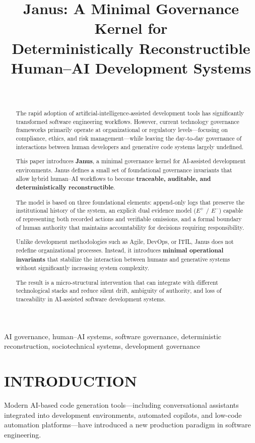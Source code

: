 \documentclass[conference]{IEEEtran}
\title{Janus: A Minimal Governance Kernel for\\
Deterministically Reconstructible\\
Human--AI Development Systems}
\author{\IEEEauthorblockN{Lic. Martín Nicolás Sánchez Morales}\\
\IEEEauthorblockA{Founder, Janus Governance Project\\
Argentina\\
\url{https://janusgovernance.org}}}
\begin{document}
\maketitle

\begin{abstract}
The rapid adoption of artificial-intelligence-assisted development tools has significantly transformed software engineering workflows. However, current technology governance frameworks primarily operate at organizational or regulatory levels---focusing on compliance, ethics, and risk management---while leaving the day-to-day governance of interactions between human developers and generative code systems largely undefined.

This paper introduces \textbf{Janus}, a minimal governance kernel for AI-assisted development environments. Janus defines a small set of foundational governance invariants that allow hybrid human--AI workflows to become \textbf{traceable, auditable, and deterministically reconstructible}.

The model is based on three foundational elements: append-only logs that preserve the institutional history of the system, an explicit dual evidence model ($E^{+}$ / $E^{-}$) capable of representing both recorded actions and verifiable omissions, and a formal boundary of human authority that maintains accountability for decisions requiring responsibility.

Unlike development methodologies such as Agile, DevOps, or ITIL, Janus does not redefine organizational processes. Instead, it introduces \textbf{minimal operational invariants} that stabilize the interaction between humans and generative systems without significantly increasing system complexity.

The result is a micro-structural intervention that can integrate with different technological stacks and reduce silent drift, ambiguity of authority, and loss of traceability in AI-assisted software development systems.
\end{abstract}

\begin{IEEEkeywords}
AI governance, human--AI systems, software governance, deterministic reconstruction, sociotechnical systems, development governance
\end{IEEEkeywords}

\section{INTRODUCTION}
Modern AI-based code generation tools---including conversational assistants integrated into development environments, automated copilots, and low-code automation platforms---have introduced a new production paradigm in software engineering.
\end{document}
